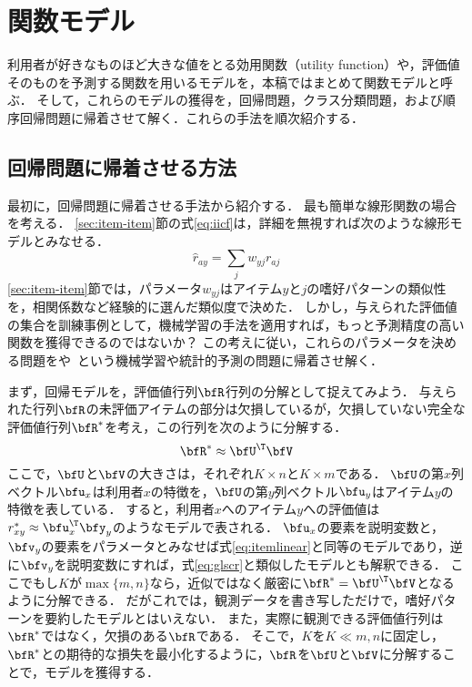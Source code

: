 \section{関数モデル}
\label{sec:funcmodel}

利用者が好きなものほど大きな値をとる効用関数（utility function）や，評価値そのものを予測する関数を用いるモデルを，本稿ではまとめて関数モデルと呼ぶ．
そして，これらのモデルの獲得を，回帰問題，クラス分類問題，および順序回帰問題に帰着させて解く．これらの手法を順次紹介する．

\subsection{回帰問題に帰着させる方法}

最初に，回帰問題に帰着させる手法から紹介する．
最も簡単な線形関数の場合を考える．
\ref{sec:item-item}節の式\eqref{eq:iicf}は，詳細を無視すれば次のような線形モデルとみなせる．
\begin{equation}
\hat{r}_{ay} = \sum_j w_{yj} r_{aj}
\label{eq:itemlinear}
\end{equation}
\ref{sec:item-item}節では，パラメータ$w_{yj}$はアイテム$y$と$j$の嗜好パターンの類似性を，相関係数など経験的に選んだ類似度で決めた．
しかし，与えられた評価値の集合を訓練事例として，機械学習の手法を適用すれば，もっと予測精度の高い関数を獲得できるのではないか？
この考えに従い，これらのパラメータを決める問題をや~\cite{eb:053:00,jpublist:077x}という機械学習や統計的予測の問題に帰着させ解く．

まず，回帰モデルを，評価値行列$\bfR$行列の分解として捉えてみよう．
与えられた行列$\bfR$の未評価アイテムの部分は欠損しているが，欠損していない完全な評価値行列$\bfR^\ast$を考え，この行列を次のように分解する．
\begin{equation}
\bfR^\ast\approx \bfU^\T\bfV
\label{eq:factormodel}
\end{equation}
ここで，$\bfU$と$\bfV$の大きさは，それぞれ$K\times n$と$K\times m$である．
$\bfU$の第$x$列ベクトル$\bfu_x$は利用者$x$の特徴を，$\bfU$の第$y$列ベクトル$\bfu_y$はアイテム$y$の特徴を表している．
すると，利用者$x$へのアイテム$y$への評価値は$r^\ast_{xy}\approx\bfu_x^\T\bfy_y$のようなモデルで表される．
$\bfu_x$の要素を説明変数と，$\bfv_y$の要素をパラメータとみなせば式\eqref{eq:itemlinear}と同等のモデルであり，逆に$\bfv_y$を説明変数にすれば，式\eqref{eq:glscr}と類似したモデルとも解釈できる．
ここでもし$K$が$\max\{m,n\}$なら，近似ではなく厳密に$\bfR^{\ast}=\bfU^\T\bfV$となるように分解できる．
だがこれでは，観測データを書き写しただけで，嗜好パターンを要約したモデルとはいえない．
また，実際に観測できる評価値行列は$\bfR^\ast$ではなく，欠損のある$\bfR$である．
そこで，$K$を$K\ll m,n$に固定し，$\bfR^\ast$との期待的な損失を最小化するように，$\bfR$を$\bfU$と$\bfV$に分解することで，モデルを獲得する．

